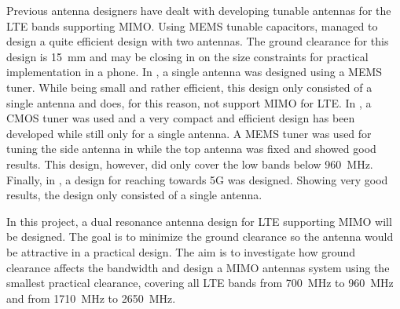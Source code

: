 Previous antenna designers have dealt with developing tunable antennas for the LTE bands supporting MIMO. Using MEMS tunable capacitors, \cite{ilvonen2014multiband} managed to design a quite efficient design with two antennas. The ground clearance for this design is \SI{15}{mm} and may be closing in on the size constraints for practical implementation in a phone. In \cite{morris2014tunable}, a single antenna was designed using a MEMS tuner. While being small and rather efficient, this design only consisted of a single antenna and does, for this reason, not support MIMO for LTE. In \cite{xia2015compact}, a CMOS tuner was used and a very compact and efficient design has been developed while still only for a single antenna. A MEMS tuner was used for tuning the side antenna in \cite{tatomirescu2015alternative} while the top antenna was fixed and showed good results. This design, however, did only cover the low bands below \SI{960}{MHz}. Finally, in \cite{trinh2016reconfigurable}, a design for reaching towards 5G was designed. Showing very good results, the design only consisted of a single antenna.

In this project, a dual resonance antenna design for LTE supporting MIMO will be designed. The goal is to minimize the ground clearance so the antenna would be attractive in a practical design. The aim is to investigate how ground clearance affects the bandwidth and design a MIMO antennas system using the smallest practical clearance, covering all LTE bands from \SI{700}{MHz} to \SI{960}{MHz} and from \SI{1710}{MHz} to \SI{2650}{MHz}.

